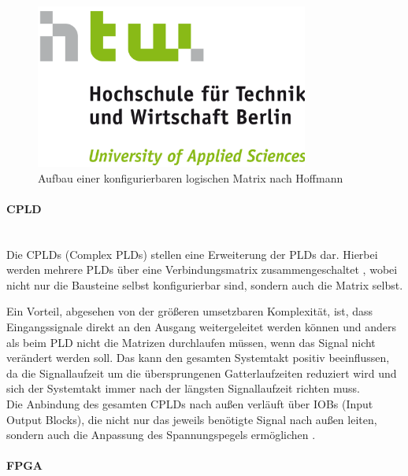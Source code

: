 \documentclass[11pt,a4paper,titlepage]{article}
\begin{document}
\begin{figure}[!ht]
\centering
\includegraphics[width=0.8\textwidth]{images/htw_hochschule.png}
\caption{Aufbau einer konfigurierbaren logischen Matrix nach Hoffmann \cite{Hoffmann}}
\label{img:Matrix}
\end{figure}

\paragraph{CPLD}$\;$\\

Die CPLDs (Complex PLDs) stellen eine Erweiterung der PLDs dar. Hierbei werden mehrere PLDs über eine Verbindungsmatrix zusammengeschaltet \cite[S. 711]{Tietze}, wobei nicht nur die Bausteine selbst konfigurierbar sind, sondern auch die Matrix selbst. 

Ein Vorteil, abgesehen von der größeren umsetzbaren Komplexität, ist, dass Eingangssignale direkt an den Ausgang weitergeleitet werden können und anders als beim PLD nicht die Matrizen durchlaufen müssen, wenn das Signal nicht verändert werden soll. Das kann den gesamten Systemtakt positiv beeinflussen, da die Signallaufzeit um die übersprungenen Gatterlaufzeiten reduziert wird und sich der Systemtakt immer nach der längsten Signallaufzeit richten muss.\\

Die Anbindung des gesamten CPLDs nach außen verläuft über IOBs (Input Output Blocks), die nicht nur das jeweils benötigte Signal nach außen leiten, sondern auch die Anpassung des Spannungspegels ermöglichen \cite{Puschmann2}.\\

\paragraph{FPGA}$\;$\\
\end{document}
